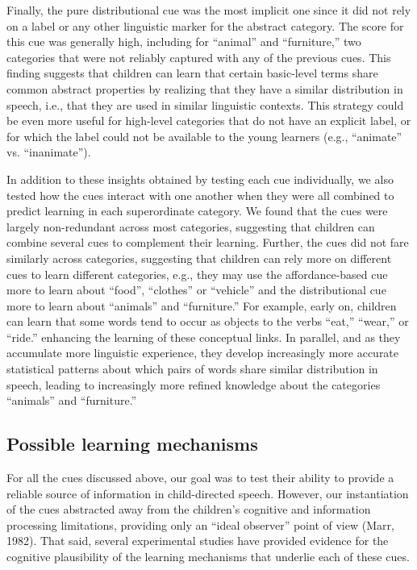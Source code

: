 \documentclass[english,,man]{apa6}
\begin{document}
Finally, the pure distributional cue was the most implicit one since it did not rely on a label or any other linguistic marker for the abstract category. The score for this cue was generally high, including for \enquote{animal} and \enquote{furniture,} two categories that were not reliably captured with any of the previous cues. This finding suggests that children can learn that certain basic-level terms share common abstract properties by realizing that they have a similar distribution in speech, i.e., that they are used in similar linguistic contexts. This strategy could be even more useful for high-level categories that do not have an explicit label, or for which the label could not be available to the young learners (e.g., \enquote{animate} vs. \enquote{inanimate}).

In addition to these insights obtained by testing each cue individually, we also tested how the cues interact with one another when they were all combined to predict learning in each superordinate category. We found that the cues were largely non-redundant across most categories, suggesting that children can combine several cues to complement their learning. Further, the cues did not fare similarly across categories, suggesting that children can rely more on different cues to learn different categories, e.g., they may use the affordance-based cue more to learn about \enquote{food}, \enquote{clothes} or \enquote{vehicle} and the distributional cue more to learn about \enquote{animals} and \enquote{furniture.} For example, early on, children can learn that some words tend to occur as objects to the verbs \enquote{eat,} \enquote{wear,} or \enquote{ride.} enhancing the learning of these conceptual links. In parallel, and as they accumulate more linguistic experience, they develop increasingly more accurate statistical patterns about which pairs of words share similar distribution in speech, leading to increasingly more refined knowledge about the categories \enquote{animals} and \enquote{furniture.}

\hypertarget{possible-learning-mechanisms}{%
\subsection{Possible learning mechanisms}\label{possible-learning-mechanisms}}

For all the cues discussed above, our goal was to test their ability to provide a reliable source of information in child-directed speech. However, our instantiation of the cues abstracted away from the children's cognitive and information processing limitations, providing only an \enquote{ideal observer} point of view (Marr, 1982). That said, several experimental studies have provided evidence for the cognitive plausibility of the learning mechanisms that underlie each of these cues.
\end{document}
